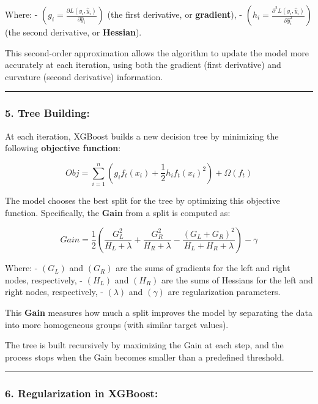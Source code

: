 \documentclass[12pt]{book}
\begin{document}
Where: -
\(( g_i = \frac{\partial L(y_i, \hat{y}_i)}{\partial \hat{y}_i} )\) (the
first derivative, or \textbf{gradient}), -
\(( h_i = \frac{\partial^2 L(y_i, \hat{y}_i)}{\partial \hat{y}_i^2} )\)
(the second derivative, or \textbf{Hessian}).

This second-order approximation allows the algorithm to update the model
more accurately at each iteration, using both the gradient (first
derivative) and curvature (second derivative) information.

\begin{center}\rule{0.5\linewidth}{0.5pt}\end{center}

\subsubsection{\texorpdfstring{5. \textbf{Tree
Building:}}{5. Tree Building:}}\label{tree-building}

At each iteration, XGBoost builds a new decision tree by minimizing the
following \textbf{objective function}:

\[
Obj = \sum_{i=1}^{n} \left( g_i f_t(x_i) + \frac{1}{2} h_i f_t(x_i)^2 \right) + \Omega(f_t)
\]

The model chooses the best split for the tree by optimizing this
objective function. Specifically, the \textbf{Gain} from a split is
computed as:

\[
Gain = \frac{1}{2} \left( \frac{G_L^2}{H_L + \lambda} + \frac{G_R^2}{H_R + \lambda} - \frac{(G_L + G_R)^2}{H_L + H_R + \lambda} \right) - \gamma
\]

Where: - \(( G_L )\) and \(( G_R )\) are the sums of gradients for the
left and right nodes, respectively, - \(( H_L )\) and \(( H_R )\) are
the sums of Hessians for the left and right nodes, respectively, -
\(( \lambda )\) and \(( \gamma )\) are regularization parameters.

This \textbf{Gain} measures how much a split improves the model by
separating the data into more homogeneous groups (with similar target
values).

The tree is built recursively by maximizing the Gain at each step, and
the process stops when the Gain becomes smaller than a predefined
threshold.

\begin{center}\rule{0.5\linewidth}{0.5pt}\end{center}

\subsubsection{\texorpdfstring{6. \textbf{Regularization in
XGBoost:}}{6. Regularization in XGBoost:}}\label{regularization-in-xgboost}
\end{document}
